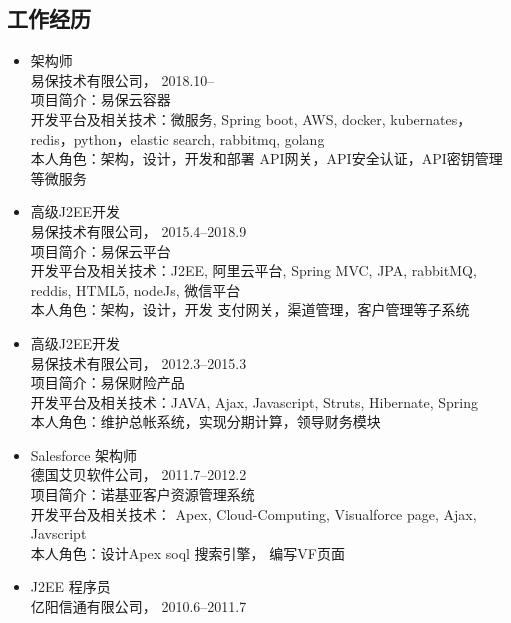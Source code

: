 \documentclass{res}
\begin{document}
\begin{CJK}{UTF8}{song}
\begin{resume}
  \section{工作经历}
  \begin{itemize}
  \item{ 架构师}\\
    { 易保技术有限公司}， \hfill 2018.10--\\
    项目简介：易保云容器\\
    开发平台及相关技术：微服务, Spring boot, AWS, docker, kubernates，redis，python，elastic search, rabbitmq, golang\\
    本人角色：架构，设计，开发和部署 API网关，API安全认证，API密钥管理 等微服务\\
  \item{ 高级J2EE开发}\\
    { 易保技术有限公司}， \hfill 2015.4--2018.9\\
    项目简介：易保云平台\\
    开发平台及相关技术：J2EE, 阿里云平台, Spring MVC, JPA,
    rabbitMQ, reddis, HTML5, nodeJs, 微信平台\\
    本人角色：架构，设计，开发 支付网关，渠道管理，客户管理等子系统\\
  \item{ 高级J2EE开发}\\
    { 易保技术有限公司}， \hfill 2012.3--2015.3\\
    项目简介：易保财险产品\\
    开发平台及相关技术：JAVA, Ajax, Javascript, Struts, Hibernate, Spring\\
    本人角色：维护总帐系统，实现分期计算，领导财务模块\\
  \item{ Salesforce 架构师}\\
    { 德国艾贝软件公司}， \hfill 2011.7--2012.2\\
    项目简介：诺基亚客户资源管理系统\\
    开发平台及相关技术： Apex, Cloud-Computing, Visualforce page, Ajax, Javscript\\
    本人角色：设计Apex soql 搜索引擎， 编写VF页面\\
  \item{ J2EE 程序员}\\
    { 亿阳信通有限公司}， \hfill 2010.6--2011.7\\

\end{itemize}
\end{resume}
\end{CJK}
\end{document}
